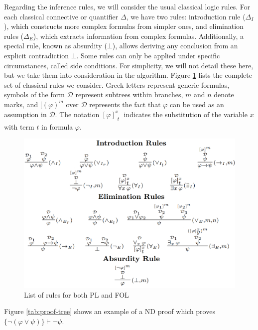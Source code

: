 Regarding the inference rules, we will consider the usual classical logic rules. For each classical connective or quantifier $\Delta$, we have two rules: introduction rule ($\Delta_I$), which constructs more complex formulas from simpler ones, and elimination rules ($\Delta_E$), which extracts information from complex formulas. Additionally, a special rule, known as absurdity (\(\bot\)), allows deriving any conclusion from an explicit contradiction $\bot$. Some rules can only be applied under specific circumstances, called side conditions. For simplicity, we will not detail these here, but we take them into consideration in the algorithm. Figure \ref{fig:nd-rules} lists the complete set of classical rules we consider. Greek letters represent generic formulas, symbols of the form \( \mathcal{D} \) represent subtrees within branches, \( m \) and \( n \) denote marks, and \(\displaystyle [(\varphi)^m\) over \( \mathcal{D} \) represents the fact that $\varphi$ can be used as an assumption in \( \mathcal{D} \).
The notation \(\displaystyle \left[ \varphi \right]^x_{\substack{t}}\) indicates the substitution of the variable $x$ with term $t$ in formula $\varphi$.


\begin{figure}
    \centering
    \includegraphics[width=1\linewidth]{resources/rules.png}
    \caption{List of rules for both PL and FOL}
    \label{fig:nd-rules}
\end{figure}

Figure \ref{tab:proof-tree} shows an example of a ND proof which proves \( \{\neg (\varphi \lor \psi)\} \vdash \neg \psi \).

